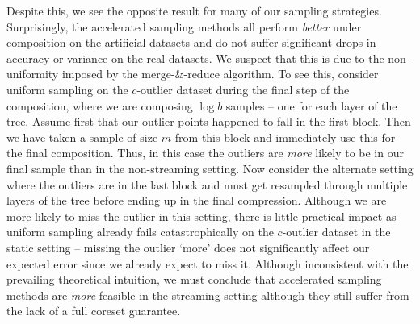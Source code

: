Despite this, we see the opposite result for many of our sampling strategies. Surprisingly, the accelerated sampling methods all perform \emph{better} under
composition on the artificial datasets and do not suffer significant drops in accuracy or variance on the real datasets. We suspect that this is due to the
non-uniformity imposed by the merge-\&-reduce algorithm. To see this, consider uniform sampling on the $c$-outlier dataset during the final step of the
composition, where we are composing $\log b$ samples -- one for each layer of the tree. Assume first that our outlier points happened to fall in the first
block. Then we have taken a sample of size $m$ from this block and immediately use this for the final composition. Thus, in this case the outliers are
\emph{more} likely to be in our final sample than in the non-streaming setting. Now consider the alternate setting where the outliers are in the last block and
must get resampled through multiple layers of the tree before ending up in the final compression. Although we are more likely to miss the outlier in this
setting, there is little practical impact as uniform sampling already fails catastrophically on the $c$-outlier dataset in the static setting -- missing the
outlier `more' does not significantly affect our expected error since we already expect to miss it. Although inconsistent with the prevailing theoretical
intuition, we must conclude that accelerated sampling methods are \emph{more} feasible in the streaming setting although they still suffer from the lack of
a full coreset guarantee.
